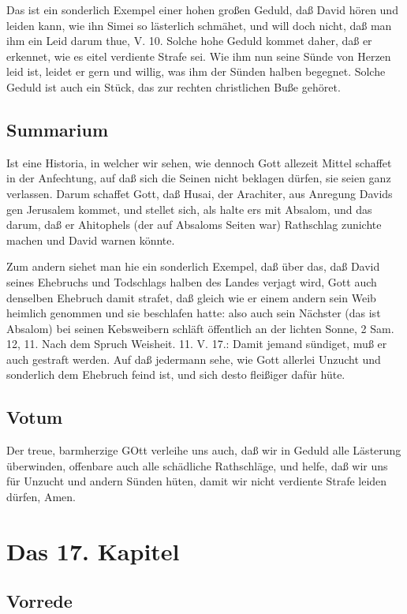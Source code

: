Das ist ein sonderlich Exempel einer hohen großen Geduld, daß David hören und leiden kann, wie ihn Simei so lästerlich schmähet, und will doch nicht, daß man ihm ein Leid darum thue, V. 10. Solche hohe Geduld kommet daher, daß er erkennet, wie es eitel verdiente Strafe sei. Wie ihm nun seine Sünde von Herzen leid ist, leidet er gern und willig, was ihm der Sünden halben begegnet. Solche Geduld ist auch ein Stück, das zur rechten christlichen Buße gehöret.

\section{Summarium}

Ist eine Historia, in welcher wir sehen, wie dennoch Gott allezeit Mittel schaffet in der Anfechtung, auf daß sich die Seinen nicht beklagen dürfen, sie seien ganz verlassen. Darum schaffet Gott, daß Husai, der Arachiter, aus Anregung Davids gen Jerusalem kommet, und stellet sich, als halte ers mit Absalom, und das darum, daß er Ahitophels (der auf Absaloms Seiten war) Rathschlag zunichte machen und David warnen könnte.

Zum andern siehet man hie ein sonderlich Exempel, daß über das, daß David seines Ehebruchs und Todschlags halben des Landes verjagt wird, Gott auch denselben Ehebruch damit strafet, daß gleich wie er einem andern sein Weib heimlich genommen und sie beschlafen hatte: also auch sein Nächster (das ist Absalom) bei seinen Kebsweibern schläft öffentlich an der lichten Sonne, 2 Sam. 12, 11. Nach dem Spruch Weisheit. 11. V. 17.: Damit jemand sündiget, muß er auch gestraft werden. Auf daß jedermann sehe, wie Gott allerlei Unzucht und sonderlich dem Ehebruch feind ist, und sich desto fleißiger dafür hüte.

\section{Votum}

Der treue, barmherzige GOtt verleihe uns auch, daß wir in Geduld alle Lästerung überwinden, offenbare auch alle schädliche Rathschläge, und helfe, daß wir uns für Unzucht und andern Sünden hüten, damit wir nicht verdiente Strafe leiden dürfen, Amen.

\chapter{Das 17. Kapitel}

\section{Vorrede}

